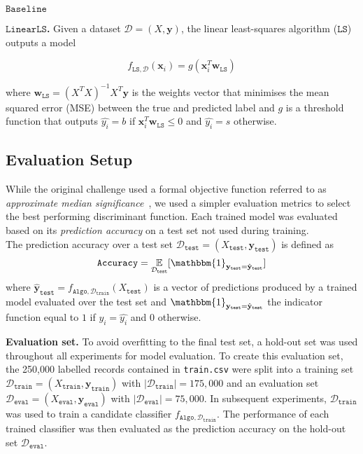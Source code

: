\documentclass[10pt,conference,compsocconf]{IEEEtran}
\newcommand{\parabf}[1]{\vspace{1mm}\noindent\textbf{#1}}
\newcommand{\Data}{\mathcal{D}}
\newcommand{\Deval}{\mathcal{D}_{\mathtt{eval}}}
\newcommand{\Dtrain}{\mathcal{D}_{\mathtt{train}}}
\newcommand{\Dtest}{\mathcal{D}_{\mathtt{test}}}
\newcommand{\Xtrain}{X_{\mathtt{train}}}
\newcommand{\ytrain}{\mathbf{y}_{\mathtt{train}}}
\newcommand{\Xeval}{X_{\mathtt{eval}}}
\newcommand{\yeval}{\mathbf{y}_{\mathtt{eval}}}
\newcommand{\Xtest}{X_{\mathtt{test}}}
\newcommand{\ytest}{\mathbf{y}_{\mathtt{test}}}
\newcommand{\ypred}[1]{\hat{\mathbf{y}}_{\mathtt{#1}}}
\newcommand{\features}{\mathbf{x}_i}
\newcommand{\target}{y_i}
\newcommand{\targetvector}{\mathbf{y}}
\newcommand{\weights}{\mathbf{w}}
\newcommand{\classifier}[2]{f_{#1, #2}}
\newcommand{\Train}{\mathtt{Algo}}
\newcommand{\LS}{\mathtt{LS}}
\begin{document}
\parabf{$\mathtt{Baseline}$}

\parabf{$\mathtt{LinearLS}$.} Given a dataset $\Data = (X, \targetvector)$, the linear least-squares algorithm ($\LS$) outputs a model

\begin{equation}
	\classifier{\LS}{\Data}(\features) = g(\features^T \weights_{\LS})
\end{equation}

where $\weights_{\LS} = (X^T X)^{-1}X^T \targetvector$ is the weights vector that minimises the mean squared error (MSE) between the true and predicted label and $g$ is a threshold function that outputs $\hat{\target} = b$ if $\features^T \weights_{\LS} \leq 0$ and $\hat{\target} = s$ otherwise.

\subsection{Evaluation Setup}
While the original challenge used a formal objective function referred to as \emph{approximate median significance}~\cite{HiggsML}, we used a simpler evaluation metrics to select the best performing discriminant function. Each trained model was evaluated based on its \emph{prediction accuracy} on a test set not used during training.\\
The prediction accuracy over a test set $\Dtest = (\Xtest, \ytest)$ is defined as
\begin{equation}
	\mathtt{Accuracy} = \underset{\Dtest}{\mathbb{E}}[ \mathbbm{1}_{\ytest = \ypred{test}} ]
\end{equation}
where $\ypred{test} = \classifier{\Train}{\Dtrain}(\Xtest)$ is a vector of predictions produced by a trained model evaluated over the test set and $\mathbbm{1}_{\ytest = \ypred{test}}$ the indicator function equal to $1$ if $\target = \hat{\target}$ and $0$ otherwise.

\parabf{Evaluation set.} To avoid overfitting to the final test set, a hold-out set was used throughout all experiments for model evaluation. To create this evaluation set, the 250,000 labelled records contained in \texttt{train.csv} were split into a training set $\Dtrain = (\Xtrain, \ytrain)$ with $|\Dtrain| = 175,000$ and an evaluation set $\Deval = (\Xeval, \yeval)$ with $|\Deval| = 75,000$. In subsequent experiments, $\Dtrain$ was used to train a candidate classifier $\classifier{\Train}{\Dtrain}$. The performance of each trained classifier was then evaluated as the prediction accuracy on the hold-out set $\Deval$.\\
\end{document}
